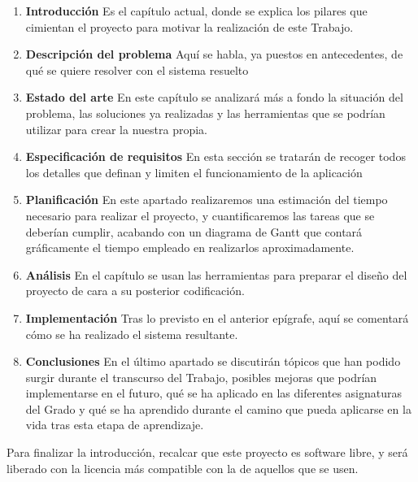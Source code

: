 \begin{enumerate}[C{a}pítulo 1.- ]
	\item \textbf{Introducción} Es el capítulo actual, donde se explica los pilares que cimientan el proyecto para motivar la realización de este Trabajo.
	\item \textbf{Descripción del problema} Aquí se habla, ya puestos en antecedentes, de qué se quiere resolver con el sistema resuelto
	\item \textbf{Estado del arte} En este capítulo se analizará más a fondo la situación del problema, las soluciones ya realizadas y las herramientas que se podrían utilizar para crear la nuestra propia.
	\item \textbf{Especificación de requisitos} En esta sección se tratarán de recoger todos los detalles que definan y limiten el funcionamiento de la aplicación
	\item \textbf{Planificación} En este apartado realizaremos una estimación del tiempo necesario para realizar el proyecto, y cuantificaremos las tareas que se deberían cumplir, acabando con un diagrama de Gantt que contará gráficamente el tiempo empleado en realizarlos aproximadamente.
	\item \textbf{Análisis} En el capítulo se usan las herramientas para preparar el diseño del proyecto de cara a su posterior codificación.
	\item \textbf{Implementación} Tras lo previsto en el anterior epígrafe, aquí se comentará cómo se ha realizado el sistema resultante.
	\item \textbf{Conclusiones} En el último apartado se discutirán tópicos que han podido surgir durante el transcurso del Trabajo, posibles mejoras que podrían implementarse en el futuro, qué se ha aplicado en las diferentes asignaturas del Grado y qué se ha aprendido durante el camino que pueda aplicarse en la vida tras esta etapa de aprendizaje.
\end{enumerate}

Para finalizar la introducción, recalcar que este proyecto es software libre, y será liberado con la licencia más compatible con la de aquellos que se usen.